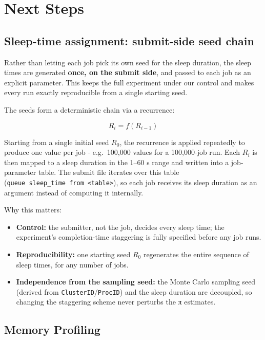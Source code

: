 \documentclass[
]{article}
\providecommand{\tightlist}{%
  \setlength{\itemsep}{0pt}\setlength{\parskip}{0pt}}
\begin{document}
\section{Next Steps}\label{next-steps}

\subsection{Sleep-time assignment: submit-side seed
chain}\label{sleep-time-assignment-submit-side-seed-chain}

Rather than letting each job pick its own seed for the sleep duration,
the sleep times are generated \textbf{once, on the submit side}, and
passed to each job as an explicit parameter. This keeps the full
experiment under our control and makes every run exactly reproducible
from a single starting seed.

The seeds form a deterministic chain via a recurrence:

\[R_i = f(R_{i-1})\]

Starting from a single initial seed \(R_0\), the recurrence is applied
repeatedly to produce one value per job - e.g.~100,000 values for a
100,000-job run. Each \(R_i\) is then mapped to a sleep duration in the
1--60 s range and written into a job-parameter table. The submit file
iterates over this table
(\texttt{queue\ sleep\_time\ from\ \textless{}table\textgreater{}}), so
each job receives its sleep duration as an argument instead of computing
it internally.

Why this matters:

\begin{itemize}
\tightlist
\item
  \textbf{Control:} the submitter, not the job, decides every sleep
  time; the experiment's completion-time staggering is fully specified
  before any job runs.
\item
  \textbf{Reproducibility:} one starting seed \(R_0\) regenerates the
  entire sequence of sleep times, for any number of jobs.
\item
  \textbf{Independence from the sampling seed:} the Monte Carlo sampling
  seed (derived from \texttt{ClusterID}/\texttt{ProcID}) and the sleep
  duration are decoupled, so changing the staggering scheme never
  perturbs the π estimates.
\end{itemize}

\subsection{Memory Profiling}\label{memory-profiling}
\end{document}
